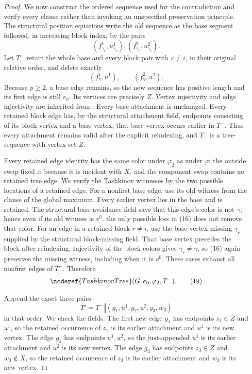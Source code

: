 \begin{proof}
We now construct the ordered sequence used for the contradiction and
verify every clause rather than invoking an unspecified preservation
principle.  The structural position equations write the old sequence as
the base segment followed, in increasing block index, by the pairs
\[
 (f^1_{\gamma_r},u^1_{\gamma_r}),
 (f^2_{\gamma_r},u^2_{\gamma_r}).
\]
Let $T^-$ retain the whole base and every block pair with $r\ne i$, in
their original relative order, and delete exactly
\[
 (f^1_\gamma,u^1),\qquad(f^2_\gamma,u^2).                     \tag{18}
\]
Because $p\ge2$, a base edge remains, so the new sequence has positive
length and its first edge is still $e_0$.  Its vertices are precisely
$Z$.  Vertex injectivity and edge injectivity are inherited from
.  Every base attachment is unchanged.  Every
retained block edge has, by the structural attachment field, endpoints
consisting of its block vertex and a base vertex; that base vertex occurs
earlier in $T^-$.  Thus every attachment remains valid after the explicit
reindexing, and $T^-$ is a tree-sequence with vertex set $Z$.

Every retained edge identity has the same color under $\varphi_2$ as
under $\varphi$: the outside swap fixed it because it is incident with
$X$, and the component swap contains no retained tree edge.  We verify
the Tashkinov witnesses by the two possible locations of a retained edge.
For a nonfirst base edge, use its old witness from the
 clause of the global maximum.  Every earlier
vertex lies in the base and is retained.  The structural base-avoidance
field says that this edge's color is not $\gamma$; hence even if its old
witness is $v^0$, the only possible loss in (16) does not remove that
color.  For an edge in a retained block $r\ne i$, use the base vertex
missing $\gamma_r$ supplied by the structural block-missing field.  That
base vertex precedes the block after reindexing.  Injectivity of the block
colors gives $\gamma_r\ne\gamma$, so (16) again preserves the missing
witness, including when it is $v^0$.  These cases exhaust all nonfirst
edges of $T^-$.  Therefore
\[
 \noderef{TashkinovTree}(G,e_0,\varphi_2,T^-).                 \tag{19}
\]

Append the exact three pairs
\[
 T'=T^-\mathbin{\Vert}(g_1,u^1,g_2,u^2,g_3,w_3)               \tag{20}
\]
in that order.  We check the  fields.  The first
new edge $g_1$ has endpoints $z_1\in Z$ and $u^1$, so the retained
occurrence of $z_1$ is its earlier attachment and $u^1$ is its new vertex.
The edge $g_2$ has endpoints $u^1,u^2$, so the just-appended $u^1$ is its
earlier attachment and $u^2$ is its new vertex.  The edge $g_3$ has
endpoints $z_3\in Z$ and $w_3\notin X$, so the retained occurrence of
$z_3$ is its earlier attachment and $w_3$ is its new vertex.


\end{proof}
